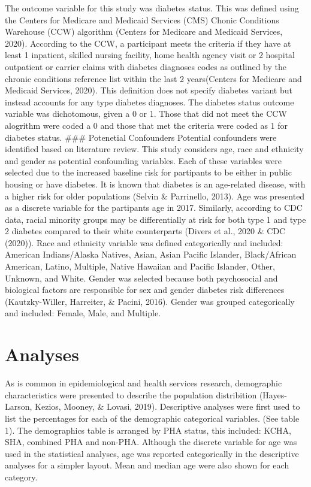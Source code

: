 \documentclass [11pt, proquest] {uwthesis}[2015/03/03]
\begin{document}
The outcome variable for this study was diabetes status. This was
defined using the Centers for Medicare and Medicaid Services (CMS)
Chonic Conditions Warehouse (CCW) algorithm (Centers for Medicare and
Medicaid Services, 2020). According to the CCW, a participant meets the
criteria if they have at least 1 inpatient, skilled nursing facility,
home health agency visit or 2 hospital outpatient or carrier claims with
diabetes diagnoses codes as outlined by the chronic conditions reference
list within the last 2 years(Centers for Medicare and Medicaid Services,
2020). This definition does not specify diabetes variant but instead
accounts for any type diabetes diagnoses. The diabetes status outcome
variable was dichotomous, given a 0 or 1. Those that did not meet the
CCW alogrithm were coded a 0 and those that met the criteria were coded
as 1 for diabetes status. \newpage
\#\#\# Potenetial Confounders Potential confounders were identified
based on literature review. This study considers age, race and ethnicity
and gender as potential confounding variables. Each of these variables
were selected due to the increased baseline risk for partipants to be
either in public housing or have diabetes. It is known that diabetes is
an age-related disease, with a higher risk for older populations (Selvin
\& Parrinello, 2013). Age was presented as a discrete variable for the
partipants age in 2017. Similarly, according to CDC data, racial
minority groups may be differentially at risk for both type 1 and type 2
diabetes compared to their white counterparts (Divers et al., 2020 \&
CDC (2020)). Race and ethnicity variable was defined categorically and
included: American Indians/Alaska Natives, Asian, Asian Pacific
Islander, Black/African American, Latino, Multiple, Native Hawaiian and
Pacific Islander, Other, Unknown, and White. Gender was selected because
both psychosocial and biological factors are responsible for sex and
gender diabetes risk differences (Kautzky-Willer, Harreiter, \& Pacini,
2016). Gender was grouped categorically and included: Female, Male, and
Multiple.

\section{Analyses}\label{analyses}

As is common in epidemiological and health services research,
demographic characteristics were presented to describe the population
distribition (Hayes-Larson, Kezios, Mooney, \& Lovasi, 2019).
Descriptive analyses were first used to list the percentages for each of
the demographic categorical variables. (See table 1). The demographics
table is arranged by PHA status, this included: KCHA, SHA, combined PHA
and non-PHA. Although the discrete variable for age was used in the
statistical analyses, age was reported categorically in the descriptive
analyses for a simpler layout. Mean and median age were also shown for
each category.
\end{document}
